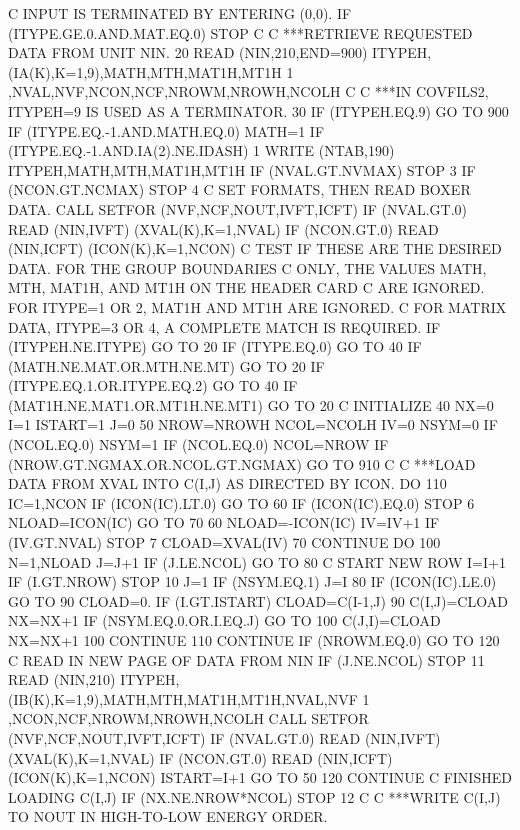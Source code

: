\begin {ccode}
C     INPUT IS TERMINATED BY ENTERING (0,0).
      IF (ITYPE.GE.0.AND.MAT.EQ.0) STOP
C
C     ***RETRIEVE REQUESTED DATA FROM UNIT NIN.
   20 READ (NIN,210,END=900) ITYPEH,(IA(K),K=1,9),MATH,MTH,MAT1H,MT1H
     1 ,NVAL,NVF,NCON,NCF,NROWM,NROWH,NCOLH
C
C     ***IN COVFILS2, ITYPEH=9 IS USED AS A TERMINATOR.
   30 IF (ITYPEH.EQ.9) GO TO 900
      IF (ITYPE.EQ.-1.AND.MATH.EQ.0) MATH=1
      IF (ITYPE.EQ.-1.AND.IA(2).NE.IDASH)
     1 WRITE (NTAB,190) ITYPEH,MATH,MTH,MAT1H,MT1H
      IF (NVAL.GT.NVMAX) STOP 3
      IF (NCON.GT.NCMAX) STOP 4
C     SET FORMATS, THEN READ BOXER DATA.
      CALL SETFOR (NVF,NCF,NOUT,IVFT,ICFT)
      IF (NVAL.GT.0) READ (NIN,IVFT) (XVAL(K),K=1,NVAL)
      IF (NCON.GT.0) READ (NIN,ICFT) (ICON(K),K=1,NCON)
C     TEST IF THESE ARE THE DESIRED DATA.  FOR THE GROUP BOUNDARIES
C     ONLY, THE VALUES MATH, MTH, MAT1H, AND MT1H ON THE HEADER CARD
C     ARE IGNORED.  FOR ITYPE=1 OR 2, MAT1H AND MT1H ARE IGNORED.
C     FOR MATRIX DATA, ITYPE=3 OR 4, A COMPLETE MATCH IS REQUIRED.
      IF (ITYPEH.NE.ITYPE) GO TO 20
      IF (ITYPE.EQ.0) GO TO 40
      IF (MATH.NE.MAT.OR.MTH.NE.MT) GO TO 20
      IF (ITYPE.EQ.1.OR.ITYPE.EQ.2) GO TO 40
      IF (MAT1H.NE.MAT1.OR.MT1H.NE.MT1) GO TO 20
C     INITIALIZE
   40 NX=0
      I=1
      ISTART=1
      J=0
   50 NROW=NROWH
      NCOL=NCOLH
      IV=0
      NSYM=0
      IF (NCOL.EQ.0) NSYM=1
      IF (NCOL.EQ.0) NCOL=NROW
      IF (NROW.GT.NGMAX.OR.NCOL.GT.NGMAX) GO TO 910
C
C     ***LOAD DATA FROM XVAL INTO C(I,J) AS DIRECTED BY ICON.
      DO 110 IC=1,NCON
      IF (ICON(IC).LT.0) GO TO 60
      IF (ICON(IC).EQ.0) STOP 6
      NLOAD=ICON(IC)
      GO TO 70
   60 NLOAD=-ICON(IC)
      IV=IV+1
      IF (IV.GT.NVAL) STOP 7
      CLOAD=XVAL(IV)
   70 CONTINUE
      DO 100 N=1,NLOAD
      J=J+1
      IF (J.LE.NCOL) GO TO 80
C     START NEW ROW
      I=I+1
      IF (I.GT.NROW) STOP 10
      J=1
      IF (NSYM.EQ.1) J=I
   80 IF (ICON(IC).LE.0) GO TO 90
      CLOAD=0.
      IF (I.GT.ISTART) CLOAD=C(I-1,J)
   90 C(I,J)=CLOAD
      NX=NX+1
      IF (NSYM.EQ.0.OR.I.EQ.J) GO TO 100
      C(J,I)=CLOAD
      NX=NX+1
  100 CONTINUE
  110 CONTINUE
      IF (NROWM.EQ.0) GO TO 120
C     READ IN NEW PAGE OF DATA FROM NIN
      IF (J.NE.NCOL) STOP 11
      READ (NIN,210) ITYPEH,(IB(K),K=1,9),MATH,MTH,MAT1H,MT1H,NVAL,NVF
     1 ,NCON,NCF,NROWM,NROWH,NCOLH
      CALL SETFOR (NVF,NCF,NOUT,IVFT,ICFT)
      IF (NVAL.GT.0) READ (NIN,IVFT) (XVAL(K),K=1,NVAL)
      IF (NCON.GT.0) READ (NIN,ICFT) (ICON(K),K=1,NCON)
      ISTART=I+1
      GO TO 50
  120 CONTINUE
C     FINISHED LOADING C(I,J)
      IF (NX.NE.NROW*NCOL) STOP 12
C
C     ***WRITE C(I,J) TO NOUT IN HIGH-TO-LOW ENERGY ORDER.

\end{ccode}
